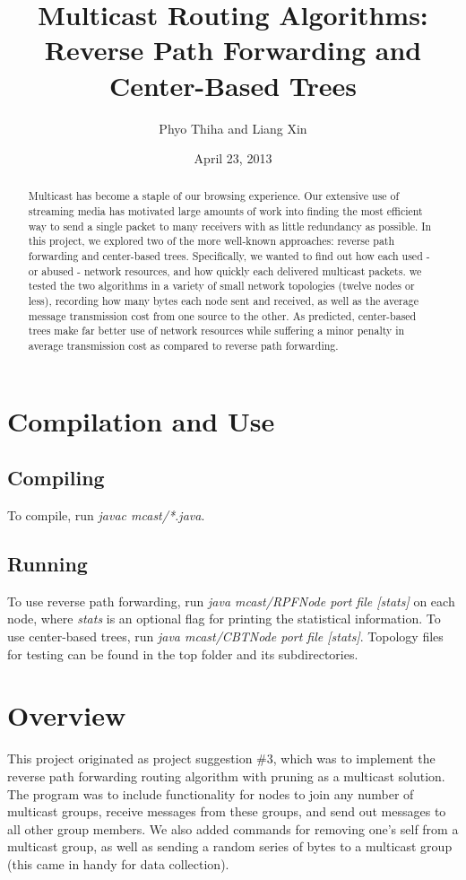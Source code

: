 \documentclass[11pt]{article}
\title{Multicast Routing Algorithms: Reverse Path Forwarding and Center-Based Trees}
\author{Phyo Thiha and Liang Xin}
\date{April 23, 2013}
\begin{document}
  \maketitle
  \begin{abstract}
    Multicast has become a staple of our browsing experience. Our extensive use of streaming media has motivated large amounts of work into finding the most efficient way to send a single packet to many receivers with as little redundancy as possible. In this project, we explored two of the more well-known approaches: reverse path forwarding and center-based trees. Specifically, we wanted to find out how each used - or abused - network resources, and how quickly each delivered multicast packets. we tested the two algorithms in a variety of small network topologies (twelve nodes or less), recording how many bytes each node sent and received, as well as the average message transmission cost from one source to the other. As predicted, center-based trees make far better use of network resources while suffering a minor penalty in average transmission cost as compared to reverse path forwarding. 
  \end{abstract}
  \newpage
  
  \section{Compilation and Use}
    \subsection{Compiling}
      To compile, run \emph{javac mcast/*.java}.
      
    \subsection{Running}
      To use reverse path forwarding, run \emph{java mcast/RPFNode port file [stats]} on each node, where \emph{stats} is an optional flag for printing the statistical information. To use center-based trees, run \emph{java mcast/CBTNode port file [stats]}. Topology files for testing can be found in the top folder and its subdirectories.
  
  \section{Overview}
    This project originated as project suggestion \#3, which was to implement the reverse path forwarding routing algorithm with pruning as a multicast solution. The program was to include functionality for nodes to join any number of multicast groups, receive messages from these groups, and send out messages to all other group members. We also added commands for removing one's self from a multicast group, as well as sending a random series of bytes to a multicast group (this came in handy for data collection).
    
\end{document}
